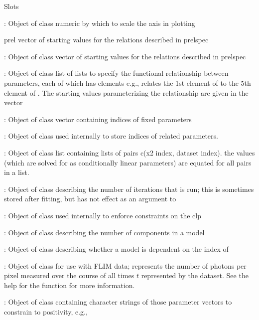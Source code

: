 \begin{Section}{Slots}
{\item[\code{scalx}:] Object of class   numeric by which to scale the  axis in plotting
\item[prel] vector of starting values for the relations described in 
prelspec
\item[\code{prel}:] Object of class   vector of starting values for the relations described in 
prelspec
\item[\code{prelspec}:] Object of class   list of lists to specify the functional
relationship between parameters, each of which has elements 
e.g., 
  relates the 1st element of  to the 5th element of 
.  The starting values parameterizing the relationship are 
given in the  vector
\item[\code{fvecind}:] Object of class   vector containing indices of fixed parameters 
\item[\code{pvecind}:] Object of class   used internally to
store indices of related parameters. 
\item[\code{groups}:] Object of class   list containing lists of pairs c(x2 index, dataset index). 
the  values (which are solved for as conditionally linear 
parameters) are equated for all pairs in a list.
\item[\code{iter}:] Object of class   describing the 
number of iterations that is run; this is sometimes 
stored after fitting, but has not effect as an argument to  
\item[\code{clpCon}:] Object of class   used internally to enforce constraints on the clp
\item[\code{ncomp}:] Object of class   describing the number of components in a model
\item[\code{clpdep}:] Object of class   describing whether a model is dependent on the index
of 
\item[\code{inten}:] Object of class   for use with FLIM data; represents the number of photons
per pixel measured over the course of all 
times $t$ represented by the dataset.  See the help for the 
function for more information. 
\item[\code{positivepar}:] Object of class   containing
character strings of those parameter vectors to constrain to positivity,
e.g., 
}
\end{Section}
